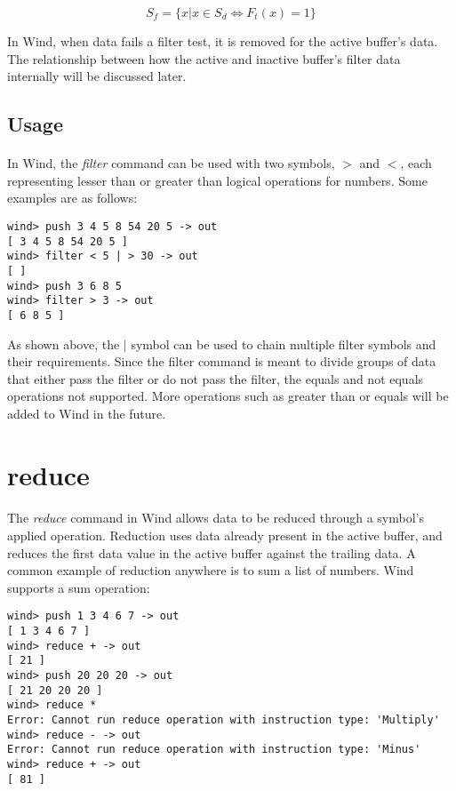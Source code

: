 $$
S_f = \{ x | x  \in S_d \iff F_t(x) = 1 \}
$$

In Wind, when data fails a filter test, it is removed for the active buffer's data. The relationship between how the active and inactive buffer's filter data internally will be discussed later.

\subsection{Usage}

\paragraph{  } In Wind, the \emph{filter} command can be used with two symbols, $>$ and $<$, each representing lesser than or greater than logical operations for numbers. Some examples are as follows:

\begin{verbatim}
wind> push 3 4 5 8 54 20 5 -> out
[ 3 4 5 8 54 20 5 ]
wind> filter < 5 | > 30 -> out
[ ]
wind> push 3 6 8 5
wind> filter > 3 -> out
[ 6 8 5 ]
\end{verbatim}

\par As shown above, the $|$ symbol can be used to chain multiple filter symbols and their requirements. Since the filter command is meant to divide groups of data that either pass the filter or do not pass the filter, the equals and not equals operations not supported. More operations such as greater than or equals will be added to Wind in the future.

\section{reduce}

\paragraph{  } The \emph{reduce} command in Wind allows data to be reduced through a symbol's applied operation. Reduction uses data already present in the active buffer, and reduces the first data value in the active buffer against the trailing data. A common example of reduction anywhere is to sum a list of numbers. Wind supports a sum operation:

\begin{verbatim}
wind> push 1 3 4 6 7 -> out
[ 1 3 4 6 7 ]
wind> reduce + -> out
[ 21 ]
wind> push 20 20 20 -> out
[ 21 20 20 20 ]
wind> reduce *
Error: Cannot run reduce operation with instruction type: 'Multiply'
wind> reduce - -> out
Error: Cannot run reduce operation with instruction type: 'Minus'
wind> reduce + -> out
[ 81 ]
\end{verbatim}

